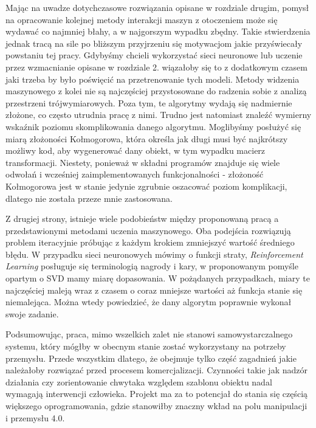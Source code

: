 \documentclass{article}
\begin{document}
Mając na uwadze dotychczasowe rozwiązania opisane w rozdziale drugim, pomysł na opracowanie kolejnej metody interakcji maszyn z otoczeniem może się wydawać co najmniej błahy, a w najgorszym wypadku zbędny. Takie stwierdzenia jednak tracą na sile po bliższym przyjrzeniu się motywacjom jakie przyświecały powstaniu tej pracy. Gdybyśmy chcieli wykorzystać sieci neuronowe lub uczenie przez wzmacnianie opisane w rozdziale 2. wiązałoby się to z dodatkowym czasem jaki trzeba by było poświęcić na przetrenowanie tych modeli. Metody widzenia maszynowego z kolei nie są najczęściej przystosowane do radzenia sobie z analizą przestrzeni trójwymiarowych. Poza tym, te algorytmy wydają się nadmiernie złożone, co często utrudnia pracę z nimi. Trudno jest natomiast znaleźć wymierny wskaźnik poziomu skomplikowania danego algorytmu. Moglibyśmy posłużyć się miarą złożoności Kołmogorowa, która określa jak długi musi być najkrótszy możliwy kod, aby wygenerować dany obiekt, w tym wypadku macierz transformacji.  Niestety, ponieważ w składni programów znajduje się wiele odwołań i wcześniej zaimplementowanych funkcjonalności - złożoność Kołmogorowa jest w stanie jedynie zgrubnie oszacować poziom komplikacji, dlatego nie została przeze mnie zastosowana.

Z drugiej strony, istnieje wiele podobieństw między proponowaną pracą a przedstawionymi metodami uczenia maszynowego. Oba podejścia rozwiązują problem iteracyjnie próbując z każdym krokiem zmniejszyć wartość średniego błędu. W przypadku sieci neuronowych mówimy o funkcji straty, \emph{Reinforcement Learning} posługuje się terminologią nagrody i kary, w proponowanym pomyśle opartym o SVD mamy miarę dopasowania. W pożądanych przypadkach, miary te najczęściej maleją wraz z czasem o coraz mniejsze wartości aż funkcja stanie się niemalejąca. Można wtedy powiedzieć, że dany algorytm poprawnie wykonał swoje zadanie.

Podsumowując, praca, mimo wszelkich zalet nie stanowi samowystarczalnego systemu, który mógłby w obecnym stanie zostać wykorzystany na potrzeby przemysłu. Przede wszystkim dlatego, że obejmuje tylko część zagadnień jakie należałoby rozwiązać przed procesem komercjalizacji. Czynności takie jak nadzór działania czy zorientowanie chwytaka względem szablonu obiektu nadal wymagają interwencji człowieka. Projekt ma za to potencjał do stania się częścią większego oprogramowania, gdzie stanowiłby znaczny wkład na polu manipulacji i przemysłu 4.0.
\end{document}
